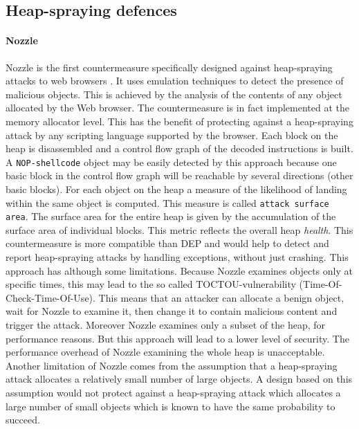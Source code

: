 \subsection{Heap-spraying defences} \label{cmnozzle}

\paragraph{Nozzle} 
Nozzle is the first countermeasure specifically designed against heap-spraying attacks to web browsers \cite{nozzle08tr}. It uses emulation techniques to detect the presence of malicious objects. This is achieved by the analysis of the contents of any object allocated by the Web browser. The countermeasure is in fact implemented at the memory allocator level. This has the benefit of protecting against a heap-spraying attack by any scripting language supported by the browser.
Each block on the heap is disassembled and a control flow graph of the decoded instructions is built. A \texttt{NOP-shellcode} object may be easily detected by this approach because one basic block in the control flow graph will be reachable by several directions (other basic blocks). For each object on the heap a measure of the likelihood of landing within the same object is computed. This measure is called \texttt{attack surface area}. The surface area for the entire heap is given by the accumulation of the surface area of individual blocks. This metric reflects the overall heap \textit{health}. 
This countermeasure is more compatible than DEP and would help to detect and report heap-spraying attacks by handling exceptions, without just crashing. This approach has although some limitations. Because Nozzle examines objects only at specific times, this may lead to the so called TOCTOU-vulnerability (Time-Of-Check-Time-Of-Use). This means that an attacker can allocate a benign object, wait for Nozzle to examine it, then change it to contain malicious content and trigger the attack. Moreover Nozzle examines only a subset of the heap, for performance reasons. But this approach will lead to a lower level of security. The performance overhead of Nozzle examining the whole heap is unacceptable.
Another limitation of Nozzle comes from the assumption that a heap-spraying attack allocates a relatively small number of large objects. A design based on this assumption would not protect against a heap-spraying attack which allocates a large number of small objects which is known to have the same probability to succeed. 

